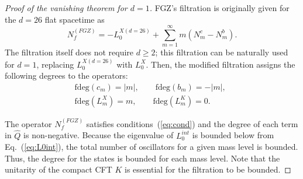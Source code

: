 \documentclass[a4paper,12pt]{article}
\newcommand{\eq}[1]{(\ref{eq:#1})}
\newcommand{\hQ}{\hat{Q}}
\begin{document}
\begin{proof}[Proof of the vanishing theorem for $d=1$]
FGZ's filtration is originally given for the $d=26$
flat spacetime as
\begin{equation}
%
N^{(FGZ)}_{f} = -L_{0}^{X(d=26)} + \sum_{m=1}^{\infty} m ( N_{m}^{c} -
N_{m}^{b} ).
\label{eq:fgz}
%
\end{equation}
The filtration itself does not require $d \geq 2$;
this filtration can be
naturally used for $d=1$, replacing $L_{0}^{X(d=26)}$ with
$L_{0}^{X}$. Then, the modified filtration assigns the following degrees to the operators:
\begin{subequations}
\begin{eqnarray}
%
&&\mbox{fdeg}(c_{m}) =  |m|, \qquad \mbox{fdeg}(b_{m}) = -|m|, \qquad \\
&&\mbox{fdeg}(L_{m}^{X}) = m, \qquad \mbox{fdeg}(L_{m}^{K}) = 0. 
%
\end{eqnarray}
\end{subequations}

The operator $N^{(FGZ)}_{f}$ satisfies conditions~\eq{cond} and the
degree of each term in $\hQ$ is non-negative. Because the eigenvalue of
$L_{0}^{int}$ is bounded below from Eq.~\eq{L0int}, the total number of
oscillators for a given mass level is bounded. Thus, the degree for the
states is bounded for each mass level. Note that the unitarity of the
compact CFT $K$ is essential for the filtration to be bounded.


\end{proof}
\end{document}
